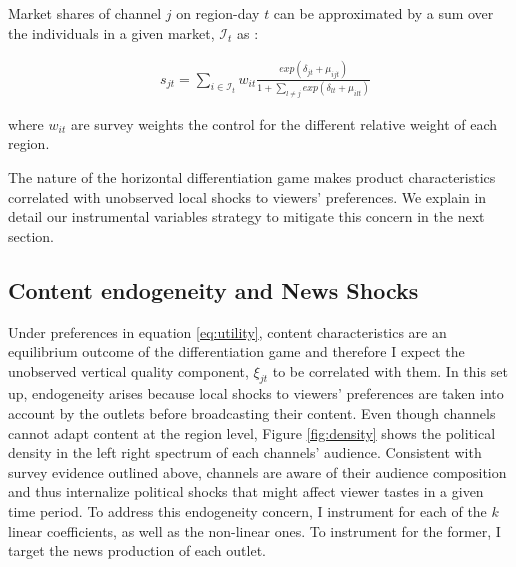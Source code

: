 \documentclass[12pt]{article}
\begin{document}
	Market shares of channel $j$ on region-day $t$ can be approximated by a sum over the individuals in a given market, $\mathcal{I}_t$ as : 
	
	
	\begin{equation}\label{eq:shares}
		\begin{aligned}
			& s_{jt} = \sum_{i \in \mathcal{I}_t} w_{it} \frac{exp(\delta_{jt} + \mu_{ijt})}{ 1+ \sum_{l\neq j } exp(\delta_{lt} + \mu_{ilt}) } 
		\end{aligned}
	\end{equation} 
	
	
	where $w_{it}$ are survey weights the control for the different relative weight of each region. 
	
	
	
	The nature of the horizontal differentiation game makes product characteristics correlated with unobserved local shocks to viewers' preferences.  We explain in detail our instrumental variables strategy to mitigate this concern in the next section. 
	
	

	
	
	
	
	\subsection{Content endogeneity and News Shocks} \label{section:endogeneity}
	
	
	Under preferences in equation \ref{eq:utility}, content characteristics are an equilibrium outcome of the differentiation game and therefore I expect the  unobserved vertical quality component, $ \xi_{jt} $ to be correlated with them. In this set up, endogeneity arises because local shocks to viewers' preferences are taken into account by the outlets before broadcasting their content. Even though channels cannot adapt content at the region level, Figure \ref{fig:density} shows the political density in the left right spectrum of each channels' audience. Consistent with survey evidence outlined above, channels are aware of their audience composition  and thus internalize political shocks that might affect viewer tastes in a given time period. To address this endogeneity concern, I instrument for each of the $ k $ linear coefficients, as well as the non-linear ones. To instrument for the former, I target the news production of each outlet.
	
\end{document}
